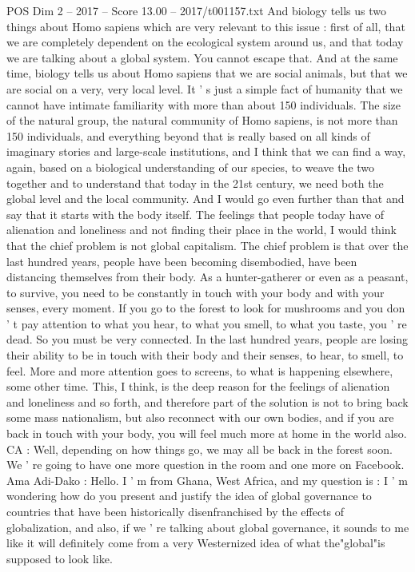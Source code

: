 \begin{textsample}{POS Dim 2 – 2017 – Score 13.00 – 2017/t001157.txt}
And biology tells us two things about Homo sapiens which are very relevant to this issue : first of all, that we are completely dependent on the ecological system around us, and that today we are talking about a global system.
You cannot escape that.
And at the same time, biology tells us about Homo sapiens that we are social animals, but that we are social on a very, very local level.
It ' s just a simple fact of humanity that we cannot have intimate familiarity with more than about 150 individuals.
The size of the natural group, the natural community of Homo sapiens, is not more than 150 individuals, and everything beyond that is really based on all kinds of imaginary stories and large-scale institutions, and I think that we can find a way, again, based on a biological understanding of our species, to weave the two together and to understand that today in the 21st century, we need both the global level and the local community.
And I would go even further than that and say that it starts with the body itself.
The feelings that people today have of alienation and loneliness and not finding their place in the world, I would think that the chief problem is not global capitalism.
The chief problem is that over the last hundred years, people have been becoming disembodied, have been distancing themselves from their body.
As a hunter-gatherer or even as a peasant, to survive, you need to be constantly in touch with your body and with your senses, every moment.
If you go to the forest to look for mushrooms and you don ' t pay attention to what you hear, to what you smell, to what you taste, you ' re dead.
So you must be very connected.
In the last hundred years, people are losing their ability to be in touch with their body and their senses, to hear, to smell, to feel.
More and more attention goes to screens, to what is happening elsewhere, some other time.
This, I think, is the deep reason for the feelings of alienation and loneliness and so forth, and therefore part of the solution is not to bring back some mass nationalism, but also reconnect with our own bodies, and if you are back in touch with your body, you will feel much more at home in the world also.
CA : Well, depending on how things go, we may all be back in the forest soon.
We ' re going to have one more question in the room and one more on Facebook.
Ama Adi-Dako : Hello.
I ' m from Ghana, West Africa, and my question is : I ' m wondering how do you present and justify the idea of global governance to countries that have been historically disenfranchised by the effects of globalization, and also, if we ' re talking about global governance, it sounds to me like it will definitely come from a very Westernized idea of what the"global"is supposed to look like.

\end{textsample}
